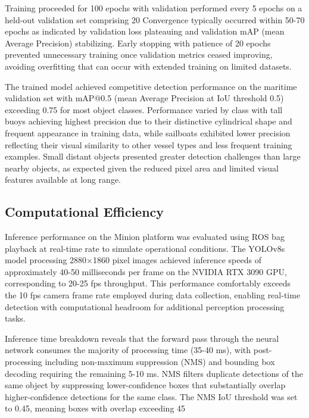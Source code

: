 Training proceeded for 100 epochs with validation performed every 5 epochs on a held-out validation set comprising 20%
Convergence typically occurred within 50-70 epochs as indicated by validation loss plateauing and validation mAP (mean Average Precision) stabilizing.
Early stopping with patience of 20 epochs prevented unnecessary training once validation metrics ceased improving, avoiding overfitting that can occur with extended training on limited datasets.

The trained model achieved competitive detection performance on the maritime validation set with mAP@0.5 (mean Average Precision at IoU threshold 0.5) exceeding 0.75 for most object classes.
Performance varied by class with tall buoys achieving highest precision due to their distinctive cylindrical shape and frequent appearance in training data, while sailboats exhibited lower precision reflecting their visual similarity to other vessel types and less frequent training examples.
Small distant objects presented greater detection challenges than large nearby objects, as expected given the reduced pixel area and limited visual features available at long range.

\subsection{Computational Efficiency} \label{sec:yolo_efficiency}

Inference performance on the Minion platform was evaluated using ROS bag playback at real-time rate to simulate operational conditions.
The YOLOv8s model processing 2880×1860 pixel images achieved inference speeds of approximately 40-50 milliseconds per frame on the NVIDIA RTX 3090 GPU, corresponding to 20-25 \ac{fps} throughput.
This performance comfortably exceeds the 10 \ac{fps} camera frame rate employed during data collection, enabling real-time detection with computational headroom for additional perception processing tasks.

Inference time breakdown reveals that the forward pass through the neural network consumes the majority of processing time (35-40 ms), with post-processing including non-maximum suppression (NMS) and bounding box decoding requiring the remaining 5-10 ms.
NMS filters duplicate detections of the same object by suppressing lower-confidence boxes that substantially overlap higher-confidence detections for the same class.
The NMS IoU threshold was set to 0.45, meaning boxes with overlap exceeding 45%

